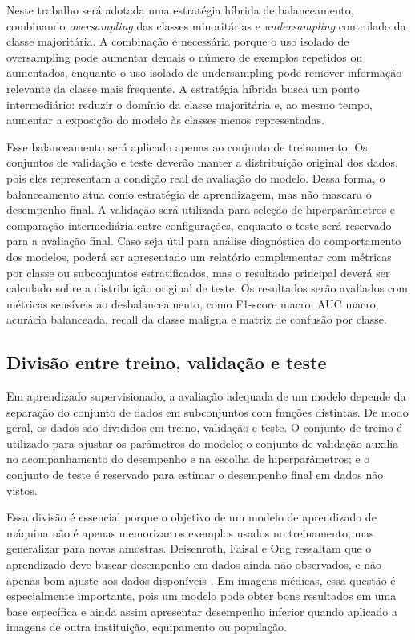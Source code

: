 \documentclass[
    12pt,
    openright,
    oneside,
    a4paper,
    english,
    brazil
]{abntex2}
\begin{document}
Neste trabalho será adotada uma estratégia híbrida de balanceamento, combinando \textit{oversampling} das classes minoritárias e \textit{undersampling} controlado da classe majoritária. A combinação é necessária porque o uso isolado de oversampling pode aumentar demais o número de exemplos repetidos ou aumentados, enquanto o uso isolado de undersampling pode remover informação relevante da classe mais frequente. A estratégia híbrida busca um ponto intermediário: reduzir o domínio da classe majoritária e, ao mesmo tempo, aumentar a exposição do modelo às classes menos representadas.

Esse balanceamento será aplicado apenas ao conjunto de treinamento. Os conjuntos de validação e teste deverão manter a distribuição original dos dados, pois eles representam a condição real de avaliação do modelo. Dessa forma, o balanceamento atua como estratégia de aprendizagem, mas não mascara o desempenho final. A validação será utilizada para seleção de hiperparâmetros e comparação intermediária entre configurações, enquanto o teste será reservado para a avaliação final. Caso seja útil para análise diagnóstica do comportamento dos modelos, poderá ser apresentado um relatório complementar com métricas por classe ou subconjuntos estratificados, mas o resultado principal deverá ser calculado sobre a distribuição original de teste. Os resultados serão avaliados com métricas sensíveis ao desbalanceamento, como F1-score macro, AUC macro, acurácia balanceada, recall da classe maligna e matriz de confusão por classe.

\subsection{Divisão entre treino, validação e teste}
\label{subsec:divisao_treino_validacao_teste}

Em aprendizado supervisionado, a avaliação adequada de um modelo depende da separação do conjunto de dados em subconjuntos com funções distintas. De modo geral, os dados são divididos em treino, validação e teste. O conjunto de treino é utilizado para ajustar os parâmetros do modelo; o conjunto de validação auxilia no acompanhamento do desempenho e na escolha de hiperparâmetros; e o conjunto de teste é reservado para estimar o desempenho final em dados não vistos.

Essa divisão é essencial porque o objetivo de um modelo de aprendizado de máquina não é apenas memorizar os exemplos usados no treinamento, mas generalizar para novas amostras. Deisenroth, Faisal e Ong ressaltam que o aprendizado deve buscar desempenho em dados ainda não observados, e não apenas bom ajuste aos dados disponíveis \cite{deisenroth2020mathematics}. Em imagens médicas, essa questão é especialmente importante, pois um modelo pode obter bons resultados em uma base específica e ainda assim apresentar desempenho inferior quando aplicado a imagens de outra instituição, equipamento ou população.
\end{document}
